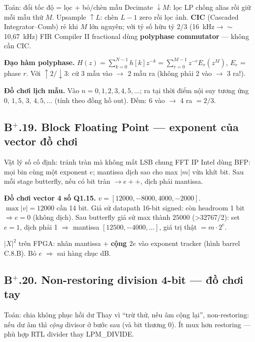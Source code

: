 \begin{firstprin}{Toán: đổi tốc độ = lọc + bỏ/chèn mẫu}
Decimate $\downarrow M$: lọc LP chống alias rồi giữ mỗi mẫu thứ $M$. Upsample $\uparrow L$: chèn $L-1$ zero rồi lọc ảnh. \textbf{CIC} (Cascaded Integrator--Comb) rẻ khi $M$ lớn nguyên; với tỷ số hữu tỷ $2/3$ (16~kHz$\to\sim$10{,}67~kHz) FIR Compiler II fractional dùng \textbf{polyphase commutator} --- không cần CIC.
\end{firstprin}

\noindent\textbf{Đạo hàm polyphase.} $H(z)=\sum_{k=0}^{N-1}h[k]z^{-k}=\sum_{r=0}^{M-1}z^{-r}E_r(z^M)$, $E_r$ = phase $r$.
Với $\uparrow2/\downarrow3$: cứ 3 mẫu vào $\to$ 2 mẫu ra (không phải 2 vào $\to$ 3 ra!).

\noindent\textbf{Đồ chơi lịch mẫu.} Vào $n=0,1,2,3,4,5,\ldots$; ra tại thời điểm nội suy tương ứng $0,\,1{,}5,\,3,\,4{,}5,\ldots$ (tính theo đồng hồ out). Đếm: 6 vào $\to$ 4 ra $=2/3$.

\subsection*{B$^+$.19. Block Floating Point --- exponent của vector đồ chơi}

\begin{firstprin}{Vật lý số cố định: tránh tràn mà không mất LSB chung}
FFT IP Intel dùng BFP: mọi bin cùng một exponent $e$; mantissa dịch sao cho max $|m|$ vừa khít bit. Sau mỗi stage butterfly, nếu có bit tràn $\to e{+}{+}$, dịch phải mantissa.
\end{firstprin}

\noindent\textbf{Đồ chơi vector 4 số Q1.15.} $v=[12000, -8000, 4000, -2000]$.
$\max|v|=12000$ cần 14 bit. Giả sử datapath 16-bit signed: còn headroom 1 bit $\Rightarrow e=0$ (không dịch). Sau butterfly giả sử max thành $25000$ (>32767/2): set $e=1$, dịch phải 1 $\Rightarrow$ mantissa $[12500,-4000,\ldots]$, giá trị thật $=m\cdot2^{e}$.

\begin{costbox}
$|X|^2$ trên FPGA: nhân mantissa + \textbf{cộng $2e$} vào exponent tracker (hình barrel C.8.B). Bỏ $e$ $\Rightarrow$ sai hàng chục dB.
\end{costbox}

\subsection*{B$^+$.20. Non-restoring division 4-bit --- đồ chơi tay}

\begin{firstprin}{Toán: chia không phục hồi dư}
Thay vì ``trừ thử, nếu âm cộng lại'', non-restoring: nếu dư âm thì \emph{cộng} divisor ở bước sau (và bit thương 0). Ít mux hơn restoring --- phù hợp RTL divider thay LPM\_DIVIDE.
\end{firstprin}

